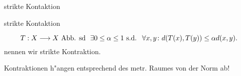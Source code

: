 \documentclass[class=article, crop=false]{standalone}
\begin{document}
\begin{zettel}{strikte Kontaktion}
\begin{flashcard}[xf6zj6kp]{strikte Kontaktion}
	\begin{definition}
		\[
			T : X \longrightarrow X \tx{Abb. sd} \exists  0 \leq \alpha \leq  1 \text{ s.d. } \forall x,y \colon d(T(x) ,T(y) ) \leq \alpha d(x,y)
		.\]
		nennen wir strikte Kontraktion.

	\end{definition}
	\begin{remark}
		Kontraktionen h"angen entsprechend des metr. Raumes von der Norm ab!
	\end{remark}
\end{flashcard}
\end{zettel}
\end{document}

